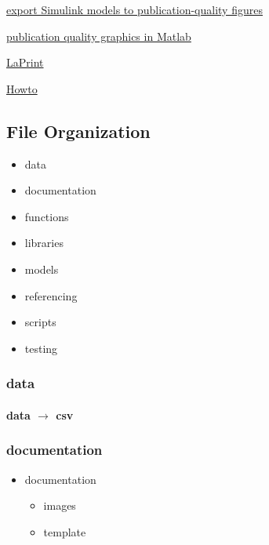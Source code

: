 \documentclass[]{article}
\providecommand{\tightlist}{%
  \setlength{\itemsep}{0pt}\setlength{\parskip}{0pt}}
\let\oldparagraph\paragraph
\renewcommand{\paragraph}[1]{\oldparagraph{#1}\mbox{}}
\begin{document}
\href{https://truongnghiem.wordpress.com/2010/07/07/export-simulink-models-to-publication-quality-figures/}{export
Simulink models to publication-quality figures}

\href{https://truongnghiem.wordpress.com/2010/05/28/more-on-publication-quality-graphics-in-matlab/}{publication
quality graphics in Matlab}

\href{http://www.mathworks.com/matlabcentral/fileexchange/4638-laprint}{LaPrint}

\href{http://www.mathworks.com/matlabcentral/answers/94951-how-do-i-save-my-simulink-model-as-a-tiff-or-jpeg-image}{Howto}

\subsection{File Organization}\label{file-organization}

\begin{itemize}
\tightlist
\item
  data
\item
  documentation
\item
  functions
\item
  libraries
\item
  models
\item
  referencing
\item
  scripts
\item
  testing
\end{itemize}

\subsubsection{data}\label{data}

\paragraph{\texorpdfstring{data \(\rightarrow\)
csv}{data \textbackslash{}rightarrow csv}}\label{data-rightarrow-csv}

\subsubsection{documentation}\label{documentation}

\begin{itemize}
\tightlist
\item
  documentation

  \begin{itemize}
  \tightlist
  \item
    images
  \item
    template
  \end{itemize}
\end{itemize}
\end{document}
